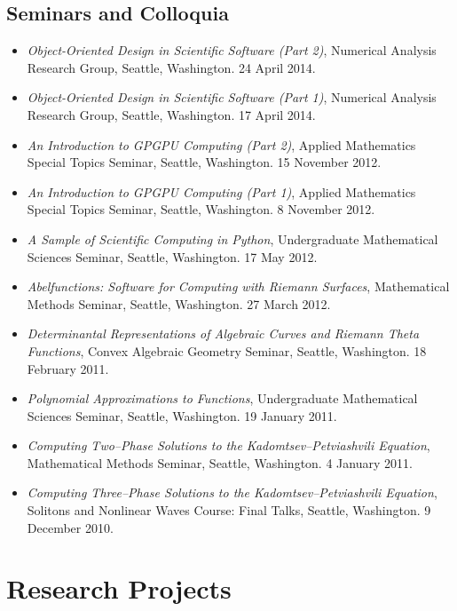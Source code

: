 \documentclass{article}
\begin{document}
\subsection*{Seminars and Colloquia}
\begin{itemize}
  \item {\it Object-Oriented Design in Scientific Software (Part 2)},
    Numerical Analysis Research Group, Seattle, Washington. 24 April
    2014.
  \item {\it Object-Oriented Design in Scientific Software (Part 1)},
    Numerical Analysis Research Group, Seattle, Washington. 17 April
    2014.
  \item {\it An Introduction to GPGPU Computing (Part 2)}, Applied
    Mathematics Special Topics Seminar, Seattle, Washington. 15
    November 2012.
  \item {\it An Introduction to GPGPU Computing (Part 1)}, Applied
    Mathematics Special Topics Seminar, Seattle, Washington. 8
    November 2012.
  \item {\it A Sample of Scientific Computing in Python},
    Undergraduate Mathematical Sciences Seminar, Seattle,
    Washington. 17 May 2012.
  \item {\it Abelfunctions: Software for Computing with Riemann
    Surfaces}, Mathematical Methods Seminar, Seattle, Washington. 27
    March 2012.
  \item {\it Determinantal Representations of Algebraic Curves and
    Riemann Theta Functions}, Convex Algebraic Geometry Seminar,
    Seattle, Washington. 18 February 2011.
  \item {\it Polynomial Approximations to Functions}, Undergraduate
    Mathematical Sciences Seminar, Seattle, Washington. 19 January 2011.
  \item {\it Computing Two--Phase Solutions to the
    Kadomtsev--Petviashvili Equation}, Mathematical Methods Seminar,
    Seattle, Washington. 4 January 2011.
  \item {\it Computing Three--Phase Solutions to the
    Kadomtsev--Petviashvili Equation}, Solitons and Nonlinear Waves
    Course: Final Talks, Seattle, Washington. 9 December 2010.
\end{itemize}



\section*{Research Projects}
\end{document}
